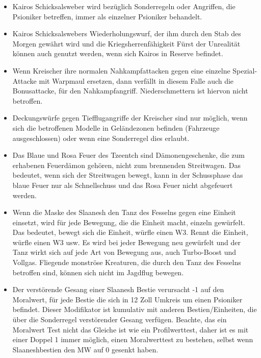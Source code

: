 \begin{itemize}
 \item Kairos Schicksalsweber wird bezüglich Sonderregeln oder Angriffen, die
  Psioniker betreffen, immer als einzelner Psioniker behandelt.
 \item Kairos Schicksalswebers Wiederholungswurf, der ihm durch den Stab des
  Morgen gewährt wird und die Kriegsherrenfähigkeit Fürst der Unrealität können
  auch genutzt werden, wenn sich Kairos in Reserve befindet. 
 
 \item Wenn Kreischer ihre normalen Nahkampfattacken gegen eine einzelne
  Spezial-Attacke mit Warpmaul ersetzen, dann verfällt in diesem Falle auch die
  Bonusattacke, für den Nahkampfangriff. Niederschmettern ist hiervon nicht
  betroffen.

 \item Deckungswürfe gegen Tiefflugangriffe der Kreischer sind nur möglich, wenn
  sich die betroffenen Modelle in Geländezonen befinden (Fahrzeuge
  ausgeschlossen) oder wenn eine Sonderregel dies erlaubt.

 \item Das Blaue und Rosa Feuer des Tzeentch sind Dämonengeschenke, die zum
  erhabenen Feuerdämon gehören, nicht zum brennenden Streitwagen. Das bedeutet,
  wenn sich der Streitwagen bewegt, kann in der Schussphase das blaue Feuer nur
  als Schnellschuss und das Rosa Feuer nicht abgefeuert werden.

 \item Wenn die Maske des Slaanesh den Tanz des Fesselns gegen eine Einheit
  einsetzt, wird für jede Bewegung, die die Einheit macht, einzeln gewürfelt.
  Das bedeutet, bewegt sich die Einheit, würfle einen W3. Rennt die Einheit,
  würfle einen W3 usw. Es wird bei jeder Bewegung neu gewürfelt und der Tanz
  wirkt sich auf jede Art von Bewegung aus, auch Turbo-Boost und Vollgas.
  Fliegende monströse Kreaturen, die durch den Tanz des Fesselns betroffen sind,
  können sich nicht im Jagdflug bewegen.

 \item Der verstörende Gesang einer Slaanesh Bestie verursacht -1 auf den
  Moralwert, für jede Bestie die sich in 12 Zoll Umkreis um einen Psioniker
  befindet. Dieser Modifikator ist kumulativ mit anderen Bestien/Einheiten, die
  über die Sonderregel verstörender Gesang verfügen. Beachte, das ein Moralwert
  Test nicht das Gleiche ist wie ein Profilwerttest, daher ist es mit einer
  Doppel 1 immer möglich, einen Moralwerttest zu bestehen, selbst wenn
  Slaaneshbestien den MW auf 0 gesenkt haben.


\end{itemize}
